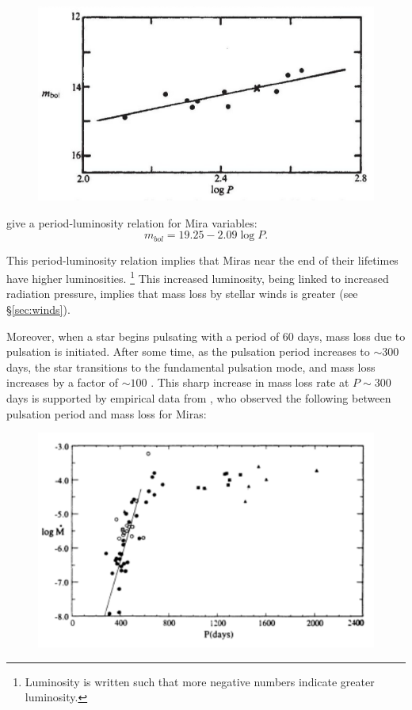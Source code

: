 \documentclass[twocolumn]{aastex63}
\begin{document}
\begin{figure}[ht]
    \includegraphics[width=\textwidth]{period_luminosity.png}
\end{figure}

\cite{glass} give a period-luminosity relation for Mira variables: 
\begin{equation*}
    m_{bol} = 19.25 - 2.09\log P.
\end{equation*}

This period-luminosity relation implies that Miras near the end of their lifetimes have higher luminosities. \footnote{Luminosity is written such that more negative numbers indicate greater luminosity.} This increased luminosity, being linked to increased radiation pressure, implies that mass loss by stellar winds is greater (see \S \ref{sec:winds}). 

Moreover, when a star begins pulsating with a period of 60 days, mass loss due to pulsation is initiated. After some time, as the pulsation period increases to $\sim 300$ days, the star transitions to the fundamental pulsation mode, and mass loss increases by a factor of $\sim 100$ \citep{mcdonald, bedijn}. This sharp increase in mass loss rate at $P\sim 300$ days is supported by empirical data from \cite{vassiliadis}, who observed the following between pulsation period and mass loss for Miras:
\begin{figure}[ht]
    \includegraphics[width=\textwidth]{pulsation_massloss.png}
\end{figure}
\end{document}
